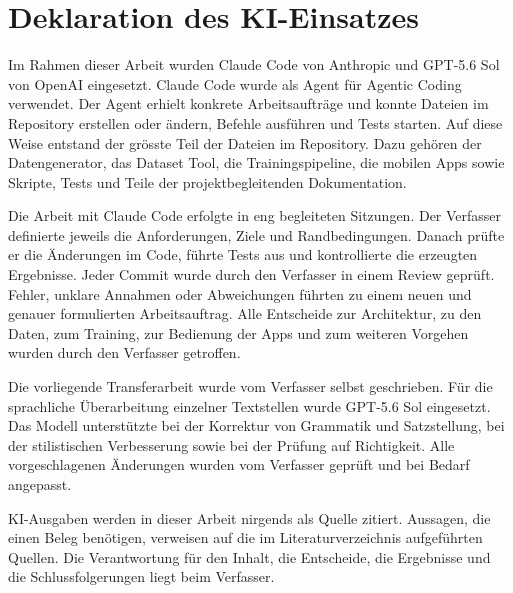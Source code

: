 \section{Deklaration des KI-Einsatzes}\label{app:ki-deklaration}

Im Rahmen dieser Arbeit wurden Claude Code von Anthropic und GPT-5.6 Sol
von OpenAI eingesetzt. Claude Code wurde als Agent für Agentic Coding
verwendet. Der Agent erhielt konkrete Arbeitsaufträge und konnte Dateien
im Repository erstellen oder ändern, Befehle ausführen und Tests starten.
Auf diese Weise entstand der grösste Teil der Dateien im Repository. Dazu
gehören der Datengenerator, das Dataset Tool, die Trainingspipeline, die
mobilen Apps sowie Skripte, Tests und Teile der projektbegleitenden
Dokumentation.

Die Arbeit mit Claude Code erfolgte in eng begleiteten Sitzungen. Der Verfasser
definierte jeweils die Anforderungen, Ziele und Randbedingungen. Danach
prüfte er die Änderungen im Code, führte Tests aus und kontrollierte die
erzeugten Ergebnisse. Jeder Commit wurde durch den Verfasser in einem
Review geprüft. Fehler, unklare Annahmen oder Abweichungen führten zu
einem neuen und genauer formulierten Arbeitsauftrag. Alle Entscheide zur
Architektur, zu den Daten, zum Training, zur Bedienung der Apps und zum
weiteren Vorgehen wurden durch den Verfasser getroffen.

Die vorliegende Transferarbeit wurde vom Verfasser selbst geschrieben.
Für die sprachliche Überarbeitung einzelner Textstellen wurde GPT-5.6 Sol
eingesetzt. Das Modell unterstützte bei der Korrektur von Grammatik und
Satzstellung, bei der stilistischen Verbesserung sowie bei der Prüfung
auf Richtigkeit. Alle vorgeschlagenen Änderungen wurden vom Verfasser
geprüft und bei Bedarf angepasst.

KI-Ausgaben werden in dieser Arbeit nirgends als Quelle zitiert. Aussagen,
die einen Beleg benötigen, verweisen auf die im Literaturverzeichnis
aufgeführten Quellen. Die Verantwortung für den Inhalt, die Entscheide,
die Ergebnisse und die Schlussfolgerungen liegt beim Verfasser.

